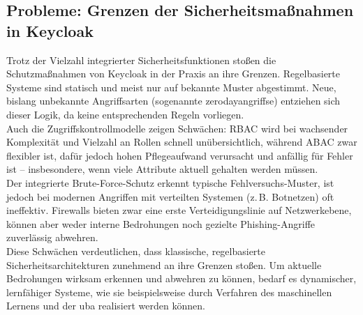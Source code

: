 \documentclass[a4paper,12pt]{article}
\begin{document}
	\subsection{Probleme: Grenzen der Sicherheitsmaßnahmen in Keycloak}
	Trotz der Vielzahl integrierter Sicherheitsfunktionen stoßen die Schutzmaßnahmen von Keycloak in der Praxis an ihre Grenzen. Regelbasierte Systeme sind statisch und meist nur auf bekannte Muster abgestimmt. Neue, bislang unbekannte Angriffsarten (sogenannte \glspl{zerodayangriff}e) entziehen sich dieser Logik, da keine entsprechenden Regeln vorliegen.
	\\[0.5em]
	Auch die Zugriffskontrollmodelle zeigen Schwächen: RBAC wird bei wachsender Komplexität und Vielzahl an Rollen schnell unübersichtlich, während ABAC zwar flexibler ist, dafür jedoch hohen Pflegeaufwand verursacht und anfällig für Fehler ist – insbesondere, wenn viele Attribute aktuell gehalten werden müssen.
	\\[0.5em]
	Der integrierte Brute-Force-Schutz erkennt typische Fehlversuchs-Muster, ist jedoch bei modernen Angriffen mit verteilten Systemen (z.\,B. Botnetzen) oft ineffektiv. Firewalls bieten zwar eine erste Verteidigungslinie auf Netzwerkebene, können aber weder interne Bedrohungen noch gezielte Phishing-Angriffe zuverlässig abwehren.
	\\[0.5em]
	Diese Schwächen verdeutlichen, dass klassische, regelbasierte Sicherheitsarchitekturen zunehmend an ihre Grenzen stoßen. Um aktuelle Bedrohungen wirksam erkennen und abwehren zu können, bedarf es dynamischer, lernfähiger Systeme, wie sie beispielsweise durch Verfahren des maschinellen Lernens und der \gls{uba} realisiert werden können.
	
\end{document}
